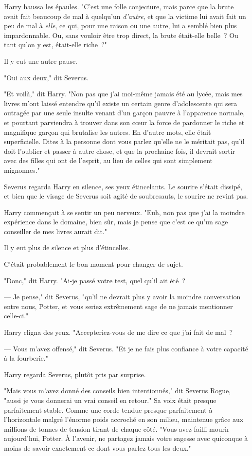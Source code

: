 Harry haussa les épaules. "C'est une folle conjecture, mais parce que la brute avait fait beaucoup de mal à quelqu'un \emph{d'autre}, et que la victime lui avait fait un peu de mal à \emph{elle}, ce qui, pour une raison ou une autre, lui a semblé bien plus impardonnable. Ou, sans vouloir être trop direct, la brute était-elle belle~? Ou tant qu'on y est, était-elle riche~?"

Il y eut une autre pause.

"Oui aux deux," dit Severus.

"Et voilà," dit Harry. "Non pas que j'ai moi-même jamais été au lycée, mais mes livres m'ont laissé entendre qu'il existe un certain genre d'adolescente qui sera outragée par une seule insulte venant d'un garçon pauvre à l'apparence normale, et pourtant parviendra à trouver dans son cœur la force de pardonner le riche et magnifique garçon qui brutalise les autres. En d'autre mots, elle était superficielle. Dites à la personne dont vous parlez qu'elle ne le méritait pas, qu'il doit l'oublier et passer à autre chose, et que la prochaine fois, il devrait sortir avec des filles qui ont de l'esprit, au lieu de celles qui sont simplement mignonnes."

Severus regarda Harry en silence, ses yeux étincelants. Le sourire s'était dissipé, et bien que le visage de Severus soit agité de soubresauts, le sourire ne revint pas.

Harry commençait à se sentir un peu nerveux. "Euh, non pas que j'ai la moindre expérience dans le domaine, bien sûr, mais je pense que c'est ce qu'un sage conseiller de mes livres aurait dit."

Il y eut plus de silence et plus d'étincelles.

C'était probablement le bon moment pour changer de sujet.

"Donc," dit Harry. "Ai-je passé votre test, quel qu'il ait été~?

--- Je pense," dit Severus, "qu'il ne devrait plus y avoir la moindre conversation entre nous, Potter, et vous seriez extrêmement sage de ne jamais mentionner celle-ci."

Harry cligna des yeux. "Accepteriez-vous de me dire ce que j'ai fait de mal~?

--- Vous m'avez offensé," dit Severus. "Et je ne fais plus confiance à votre capacité à la fourberie."

Harry regarda Severus, plutôt pris par surprise.

"Mais vous m'avez donné des conseils bien intentionnés," dit Severus Rogue, "aussi je vous donnerai un vrai conseil en retour." Sa voix était presque parfaitement stable. Comme une corde tendue presque parfaitement à l'horizontale malgré l'énorme poids accroché en son milieu, maintenue grâce aux millions de tonnes de tension tirant de chaque côté. "Vous avez failli mourir aujourd'hui, Potter. À l'avenir, ne partagez jamais votre sagesse avec quiconque à moins de savoir exactement ce dont vous parlez tous les deux."

